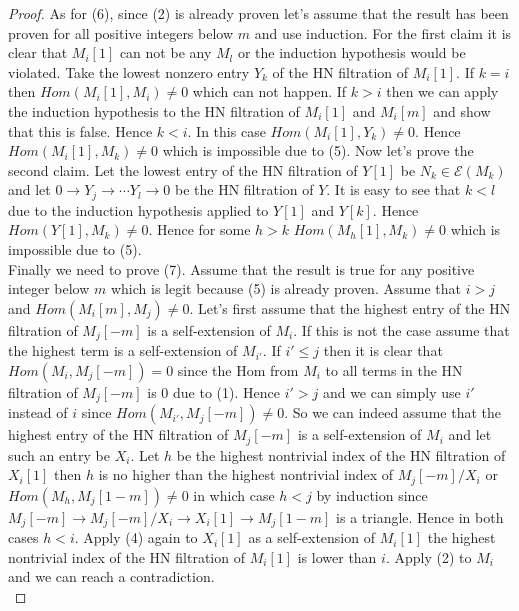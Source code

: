 \begin{proof}
\indent As for (6), since (2) is already proven let's assume that the result has been proven for all positive integers below $m$ and use induction. For the first claim it is clear that $M_i[1]$ can not be any $M_l$ or the induction hypothesis would be violated. Take the lowest nonzero entry $Y_k$ of the HN filtration of $M_i[1]$. If $k=i$ then $Hom(M_i[1],M_i)\neq 0$ which can not happen. If $k>i$ then we can apply the induction hypothesis to the HN filtration of $M_i[1]$ and $M_i[m]$ and show that this is false. Hence $k<i$. In this case $Hom(M_i[1],Y_k)\neq 0$. Hence $Hom(M_i[1],M_k)\neq 0$ which is impossible due to (5). Now let's prove the second claim. Let the lowest entry of the HN filtration of $Y[1]$ be $N_k\in\mathcal{E}(M_k)$ and let $0\to Y_j\to\cdots Y_l\to 0$ be the HN filtration of $Y$. It is easy to see that $k<l$ due to the induction hypothesis applied to $Y[1]$ and $Y[k]$. Hence $Hom(Y[1],M_k)\neq 0$. Hence for some $h>k$ $Hom(M_h[1],M_k)\neq 0$ which is impossible due to (5).\\
\indent Finally we need to prove (7). Assume that the result is true for any positive integer below $m$ which is legit because (5) is already proven. Assume that $i>j$ and $Hom(M_i[m],M_j) \neq 0$. Let's first assume that the highest entry of the HN filtration of $M_j[-m]$ is a self-extension of $M_i$. If this is not the case assume that the highest term is a self-extension of $M_{i'}$. If $i'\leq j$ then it is clear that $Hom(M_i,M_j[-m])=0$ since the Hom from $M_i$ to all terms in the HN filtration of $M_j[-m]$ is 0 due to (1). Hence $i'>j$ and we can simply use $i'$ instead of $i$ since $Hom(M_{i'},M_j[-m])\neq 0$. So we can indeed assume that the highest entry of the HN filtration of $M_j[-m]$ is a self-extension of $M_i$ and let such an entry be $X_i$. Let $h$ be the highest nontrivial index of the HN filtration of $X_i[1]$ then $h$ is no higher than the highest nontrivial index of $M_j[-m]/X_i$ or $Hom(M_h,M_j[1-m])\neq 0$ in which case $h<j$ by induction since $M_j[-m]\to M_j[-m]/X_i\to X_i[1]\to M_j[1-m]$ is a triangle. Hence in both cases $h<i$. Apply (4) again to $X_i[1]$ as a self-extension of $M_i[1]$ the highest nontrivial index of the HN filtration of $M_i[1]$ is lower than $i$. Apply (2) to $M_i$ and we can reach a contradiction.\\
\end{proof}
